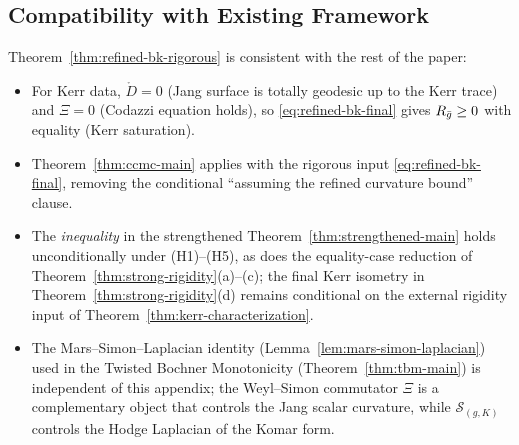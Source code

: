 \subsection{Compatibility with Existing Framework}

Theorem~\ref{thm:refined-bk-rigorous} is consistent with the rest of the paper:

\begin{itemize}
\item For Kerr data, $\mathring{D}=0$ (Jang surface is totally geodesic up to the Kerr trace) and $\Xi=0$ (Codazzi equation holds), so \eqref{eq:refined-bk-final} gives $R_{\bar{g}}\geq 0$ with equality (Kerr saturation).
\item Theorem~\ref{thm:ccmc-main} applies with the rigorous input \eqref{eq:refined-bk-final}, removing the conditional ``assuming the refined curvature bound'' clause.
\item The \emph{inequality} in the strengthened Theorem~\ref{thm:strengthened-main} holds unconditionally under (H1)--(H5), as does the equality-case reduction of Theorem~\ref{thm:strong-rigidity}(a)--(c); the final Kerr isometry in Theorem~\ref{thm:strong-rigidity}(d) remains conditional on the external rigidity input of Theorem~\ref{thm:kerr-characterization}.
\item The Mars--Simon--Laplacian identity (Lemma~\ref{lem:mars-simon-laplacian}) used in the Twisted Bochner Monotonicity (Theorem~\ref{thm:tbm-main}) is independent of this appendix; the Weyl--Simon commutator $\Xi$ is a complementary object that controls the Jang scalar curvature, while $\mathcal{S}_{(g,K)}$ controls the Hodge Laplacian of the Komar form.
\end{itemize}

